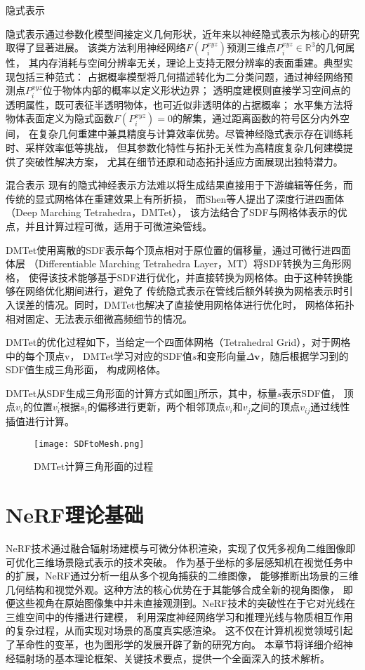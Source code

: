  隐式表示

隐式表示通过参数化模型间接定义几何形状，近年来以神经隐式表示为核心的研究取得了显著进展。
该类方法利用神经网络$F(P_i^{xyz})$预测三维点$P_i^{xyz}\in\mathbb{R}^3$的几何属性，
其内存消耗与空间分辨率无关，理论上支持无限分辨率的表面重建。典型实现包括三种范式：
占据概率模型将几何描述转化为二分类问题，通过神经网络预测点$P_i^{xyz}$位于物体内部的概率以定义形状边界；
透明度建模则直接学习空间点的透明属性，既可表征半透明物体，也可近似非透明体的占据概率；
水平集方法将物体表面定义为隐式函数$F(P_i^{xyz})=0$的解集，通过距离函数的符号区分内外空间，
在复杂几何重建中兼具精度与计算效率优势。尽管神经隐式表示存在训练耗时、采样效率低等挑战，
但其参数化特性与拓扑无关性为高精度复杂几何建模提供了突破性解决方案，
尤其在细节还原和动态拓扑适应方面展现出独特潜力。

 混合表示
现有的隐式神经表示方法难以将生成结果直接用于下游编辑等任务，而传统的显式网格体在重建效果上有所折损，
而Shen等人\cite{shen2021deep}提出了深度行进四面体（Deep Marching Tetrahedra，DMTet），
该方法结合了SDF与网格体表示的优点，并且计算过程可微，适用于可微渲染管线。

DMTet使用离散的SDF表示每个顶点相对于原位置的偏移量，通过可微行进四面体层
（Differentiable Marching Tetrahedra Layer，MT）将SDF转换为三角形网格，
使得该技术能够基于SDF进行优化，并直接转换为网格体。由于这种转换能够在网络优化期间进行，避免了
传统隐式表示在管线后额外转换为网格表示时引入误差的情况。同时，DMTet也解决了直接使用网格体进行优化时，
网格体拓扑相对固定、无法表示细微高频细节的情况。

DMTet的优化过程如下，当给定一个四面体网格（Tetrahedral Grid），对于网格中的每个顶点v，
DMTet学习对应的SDF值$s$和变形向量$\Delta\mathbf{v}$，随后根据学习到的SDF值生成三角形面，
构成网格体。

DMTet从SDF生成三角形面的计算方式如图\ref{fig:dmtet_calc}所示，其中，标量$s$表示SDF值，
顶点$v_i$的位置$v_i^\prime$根据$s_i$的偏移进行更新，两个相邻顶点$v_i$和$v_j$之间的顶点$v_{ij}$通过线性插值进行计算。

\begin{figure}[htbp]
  \centering
  \texttt{[image: SDFtoMesh.png]}
  \caption{DMTet计算三角形面的过程}
  \label{fig:dmtet_calc}
\end{figure}

\section{NeRF理论基础}

NeRF技术通过融合辐射场建模与可微分体积渲染，实现了仅凭多视角二维图像即可优化三维场景隐式表示的技术突破。
作为基于坐标的多层感知机在视觉任务中的扩展，NeRF通过分析一组从多个视角捕获的二维图像，
能够推断出场景的三维几何结构和视觉外观。这种方法的核心优势在于其能够合成全新的视角图像，
即便这些视角在原始图像集中并未直接观测到。NeRF技术的突破性在于它对光线在三维空间中的传播进行建模，
利用深度神经网络学习和推理光线与物质相互作用的复杂过程，从而实现对场景的髙度真实感渲染。
这不仅在计算机视觉领域引起了革命性的变革，也为图形学的发展开辟了新的研究方向。
本章节将详细介绍神经辐射场的基本理论框架、关键技术要点，提供一个全面深入的技术解析。

